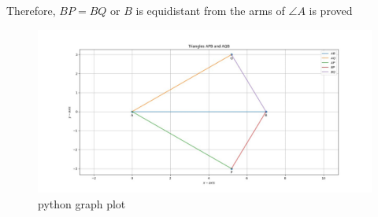 \documentclass[10pt]{article}
\begin{document}
Therefore, $BP = BQ$ or $B$ is equidistant from the arms of $\angle{A}$ is proved
\begin{figure}[H]
    \begin{center}
    \includegraphics[width=\columnwidth]{figs/pythongraph.png}
    \caption{python graph plot}
    \label{triangle $BAQ$  and $BAP$ }   
    \end{center}
\end{figure}
\end{document}
